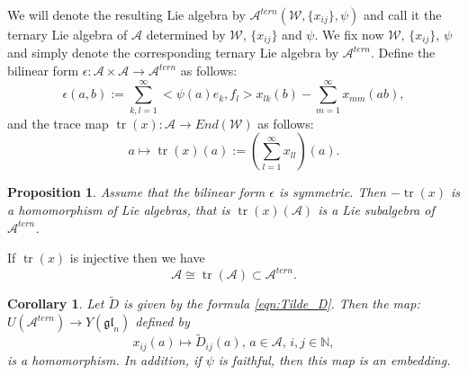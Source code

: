 \documentclass[10pt]{article}%
\numberwithin{equation}{section}
\newtheorem{cor}[thm]{Corollary}
\newtheorem{prop}[thm]{Proposition}
\newtheorem{rem}[thm]{Remark}
\newcommand{\gl}{{\mathfrak{gl}}}
\def\tr{\mathop{tr}}
\begin{document}
We will denote the resulting Lie algebra by $\mathcal{A}^{tern}(\mathcal{W}, \{x_{ij}\}, \psi)$ and call it the ternary Lie algebra of $\mathcal A$ determined by $\mathcal{W}$, $\{x_{ij}\}$ and $\psi$. We fix now $\mathcal{W}$, $\{x_{ij}\}$, $\psi$ and simply denote the corresponding ternary Lie algebra by $\mathcal{A}^{tern}$. 
Define the bilinear form $\epsilon:\mathcal{A}\times \mathcal{A}\to \mathcal{A}^{tern}$ as follows: 
$$\epsilon(a,b):=\sum\limits_{k,l=1}^{\infty}<\psi(a)e_{k},f_l> x_{lk}(b)-\sum\limits_{m=1}^{\infty} x_{mm}(ab),$$
and the trace map $\tr(x):\mathcal{A}\to End(\mathcal{W})$ as follows:
$$a\mapsto \tr(x)(a):=(\sum\limits_{l=1}^{\infty} x_{ll})(a).$$

\begin{prop}
Assume that the bilinear form $\epsilon$
 is symmetric. Then $-\tr(x)$ is a homomorphism of Lie algebras, that is $\tr(x)(\mathcal{A})$ is a Lie subalgebra of $\mathcal{A}^{tern}$. 
\end{prop} 
 
 If $\tr(x)$ is injective then 
 we have $$\mathcal{A}\cong\tr(\mathcal{A})\subset \mathcal{A}^{tern}.$$

\begin{cor}
    Let $\tilde{D}$ is given by the formula \eqref{eqn:Tilde_D}.  Then the map: $U(\mathcal{A}^{tern})\to Y(\gl_n)$ defined by $$x_{ij}(a)\mapsto \tilde{D}_{ij}(a), \, a\in \mathcal{A}, \,i,j\in\mathbb{N},$$  is a homomorphism. In addition, if $\psi$ is faithful, then this map is an embedding.
\end{cor}
\end{document}

